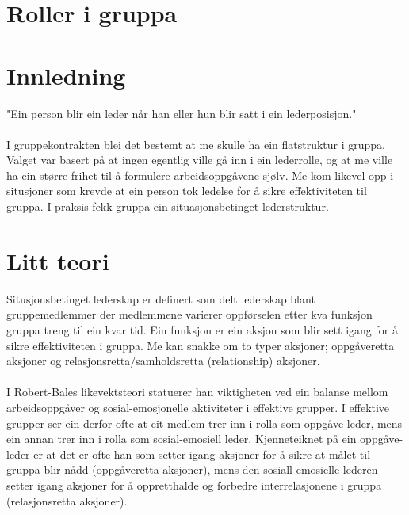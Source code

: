 \section{Roller i gruppa}
\section{Innledning}
"Ein person blir ein leder når han eller hun blir satt i ein lederposisjon."
\\
\\

I gruppekontrakten blei det bestemt at me skulle ha ein flatstruktur i gruppa. Valget var basert på at ingen egentlig ville gå inn i ein lederrolle, og at me ville ha ein større frihet til å formulere arbeidsoppgåvene sjølv. Me kom likevel opp i situsjoner som krevde at ein person tok ledelse for å sikre effektiviteten til gruppa. I praksis fekk gruppa ein situasjonsbetinget lederstruktur.

\section{Litt teori}
Situsjonsbetinget lederskap er definert som delt lederskap blant gruppemedlemmer der medlemmene varierer oppførselen etter kva funksjon gruppa treng til ein kvar tid. Ein funksjon er ein aksjon som blir sett igang for å sikre effektiviteten i gruppa. Me kan snakke om to typer aksjoner; oppgåveretta aksjoner og relasjonsretta/samholdsretta (relationship) aksjoner. 
\\
\\
I Robert-Bales likevektsteori statuerer han viktigheten ved ein balanse mellom arbeidsoppgåver og sosial-emosjonelle aktiviteter i effektive grupper. I effektive grupper ser ein derfor ofte at eit medlem trer inn i rolla som oppgåve-leder, mens ein annan trer inn i rolla som sosial-emosiell leder. Kjenneteiknet på ein oppgåve-leder er at det er ofte han som setter igang aksjoner for å sikre at målet til gruppa blir nådd (oppgåveretta aksjoner), mens den sosiall-emosielle lederen setter igang aksjoner for å oppretthalde og forbedre interrelasjonene i gruppa (relasjonsretta aksjoner).

